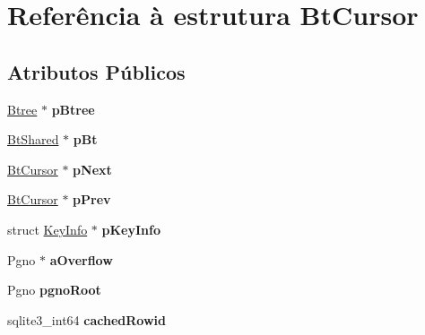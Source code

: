 \hypertarget{struct_bt_cursor}{\section{Referência à estrutura Bt\-Cursor}
\label{struct_bt_cursor}
}
\subsection*{Atributos Públicos}
\begin{DoxyCompactItemize}
\item 
\hypertarget{struct_bt_cursor_a2ad810542eaf99c9919c585624bead6f}{\hyperlink{struct_btree}{Btree} $\ast$ {\bfseries p\-Btree}}\label{struct_bt_cursor_a2ad810542eaf99c9919c585624bead6f}

\item 
\hypertarget{struct_bt_cursor_a61c245712549192f7644e5ac23c00b74}{\hyperlink{struct_bt_shared}{Bt\-Shared} $\ast$ {\bfseries p\-Bt}}\label{struct_bt_cursor_a61c245712549192f7644e5ac23c00b74}

\item 
\hypertarget{struct_bt_cursor_ad2f8fe3aa7d3fa3309692b3e8a8c2395}{\hyperlink{struct_bt_cursor}{Bt\-Cursor} $\ast$ {\bfseries p\-Next}}\label{struct_bt_cursor_ad2f8fe3aa7d3fa3309692b3e8a8c2395}

\item 
\hypertarget{struct_bt_cursor_ac4f788ee88f252ddfcef8804674c7c90}{\hyperlink{struct_bt_cursor}{Bt\-Cursor} $\ast$ {\bfseries p\-Prev}}\label{struct_bt_cursor_ac4f788ee88f252ddfcef8804674c7c90}

\item 
\hypertarget{struct_bt_cursor_ad2360bda13f959ed70672eb421fdb5ec}{struct \hyperlink{struct_key_info}{Key\-Info} $\ast$ {\bfseries p\-Key\-Info}}\label{struct_bt_cursor_ad2360bda13f959ed70672eb421fdb5ec}

\item 
\hypertarget{struct_bt_cursor_ae2dbcc15e63d349774a7ad6caef4d096}{Pgno $\ast$ {\bfseries a\-Overflow}}\label{struct_bt_cursor_ae2dbcc15e63d349774a7ad6caef4d096}

\item 
\hypertarget{struct_bt_cursor_a0b038f63a5b1b9df0b892e0773ffdd29}{Pgno {\bfseries pgno\-Root}}\label{struct_bt_cursor_a0b038f63a5b1b9df0b892e0773ffdd29}

\item 
\hypertarget{struct_bt_cursor_ad66b1a006f910aeb12de1e93d9a84cff}{sqlite3\-\_\-int64 {\bfseries cached\-Rowid}}\label{struct_bt_cursor_ad66b1a006f910aeb12de1e93d9a84cff}


\end{DoxyCompactItemize}
